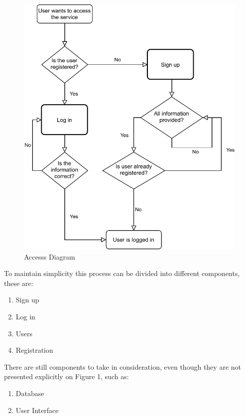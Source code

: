\documentclass{article}
\begin{document}
\begin{figure}[h!]
    \centering
    \includegraphics[scale=0.75]{Images/AccessDiagram.pdf}
    \caption{Accesss Diagram}
    \label{fig:figure 1}
\end{figure}

\vspace{110}

To maintain simplicity this process can be divided into different components, these are:

\begin{enumerate}
  \item Sign up
  \item Log in
  \item Users
  \item Registration
\end{enumerate}

There are still components to take in consideration, even though they are not presented explicitly on Figure 1, such as:
\begin{enumerate}
  \item Database
  \item User Interface
\end{enumerate}
\end{document}
